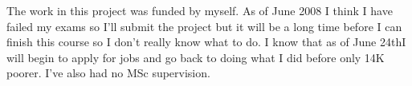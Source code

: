 
\begin{acknowledgements}

The work in this project was funded by myself. As of June 2008 I think
I have failed my exams so I'll submit the project but it will be a long time
before I can finish this course so I don't really know what to do.  I know that as of 
June 24thI will begin to apply for jobs and go back to doing what I did before only
14K poorer. I've also had no MSc supervision.

\end{acknowledgements}

